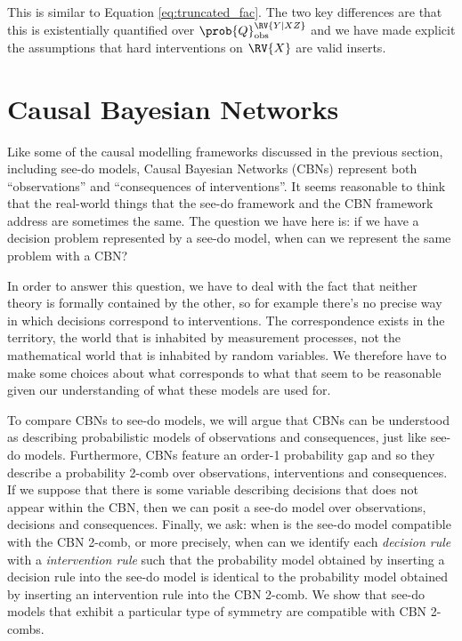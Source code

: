 This is similar to Equation \ref{eq:truncated_fac}. The two key differences are that this is existentially quantified over $\prob{Q}_{\text{obs}}^{\RV{Y|XZ}}$ and we have made explicit the assumptions that hard interventions on $\RV{X}$ are valid inserts.



\section{Causal Bayesian Networks}\label{sec:CBN}

Like some of the causal modelling frameworks discussed in the previous section, including see-do models, Causal Bayesian Networks (CBNs) represent both ``observations'' and ``consequences of interventions''. It seems reasonable to think that the real-world things that the see-do framework and the CBN framework address are sometimes the same. The question we have here is: if we have a decision problem represented by a see-do model, when can we represent the same problem with a CBN?

In order to answer this question, we have to deal with the fact that neither theory is formally contained by the other, so for example there's no precise way in which decisions correspond to interventions. The correspondence exists in the territory, the world that is inhabited by measurement processes, not the mathematical world that is inhabited by random variables. We therefore have to make some choices about what corresponds to what that seem to be reasonable given our understanding of what these models are used for.

To compare CBNs to see-do models, we will argue that CBNs can be understood as describing probabilistic models of observations and consequences, just like see-do models. Furthermore, CBNs feature an order-1 probability gap and so they describe a probability 2-comb over observations, interventions and consequences. If we suppose that there is some variable describing decisions that does not appear within the CBN, then we can posit a see-do model over observations, decisions and consequences. Finally, we ask: when is the see-do model compatible with the CBN 2-comb, or more precisely, when can we identify each \emph{decision rule} with a \emph{intervention rule} such that the probability model obtained by inserting a decision rule into the see-do model is identical to the probability model obtained by inserting an intervention rule into the CBN 2-comb. We show that see-do models that exhibit a particular type of symmetry are compatible with CBN 2-combs.

